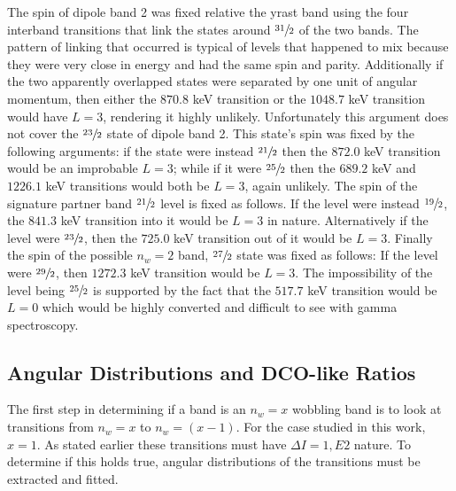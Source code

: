The spin of dipole band 2 was fixed relative the yrast band using the four interband transitions that link the states around $\sfrac{31}{2}$ of the two bands. The pattern of linking that occurred is typical of levels that happened to mix because they were very close in energy and had the same spin and parity. Additionally if the two apparently overlapped states were separated by one unit of angular momentum, then either the $870.8$ keV transition or the $1048.7$ keV transition would have $L=3$, rendering it highly unlikely. Unfortunately this argument does not cover the $\sfrac{23}{2}$ state of dipole band 2. This state's spin was fixed by the following arguments: if the state were instead $\sfrac{21}{2}$ then the $872.0$ keV transition would be an improbable $L=3$; while if it were $\sfrac{25}{2}$ then the $689.2$ keV and $1226.1$ keV transitions would both be $L=3$, again unlikely. The spin of the signature partner band $\sfrac{21}{2}$ level is fixed as follows. If the level were instead $\sfrac{19}{2}$, the $841.3$ keV transition into it would be $L=3$ in nature. Alternatively if the level were $\sfrac{23}{2}$, then the $725.0$ keV transition out of it would be $L=3$. Finally the spin of the possible $n_w=2$ band, $\sfrac{27}{2}$ state was fixed as follows: If the level were $\sfrac{29}{2}$, then $1272.3$ keV transition would be $L=3$. The impossibility of the level being $\sfrac{25}{2}$ is supported by the fact that the $517.7$ keV transition would be $L=0$ which would be highly converted and difficult to see with gamma spectroscopy. %

\subsection{Angular Distributions and DCO-like Ratios}
\label{ssec:trw-lvl-angles}

The first step in determining if a band is an $n_w=x$ wobbling band is to look at transitions from $n_w=x$ to $n_w=(x-1)$. For the case studied in this work, $x=1$. As stated earlier these transitions must have $\Delta{}I=1, E2$ nature. To determine if this holds true, angular distributions of the transitions must be extracted and fitted.

